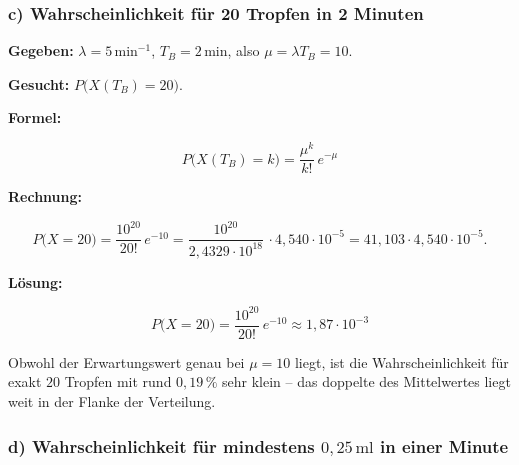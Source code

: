 \subsubsection*{c) Wahrscheinlichkeit für 20 Tropfen in 2 Minuten}

\begin{beispiel}

\textbf{Gegeben:} $\lambda = 5\,\mathrm{min}^{-1}$, $T_B = 2\,\mathrm{min}$,
also $\mu = \lambda T_B = 10$.

\textbf{Gesucht:} $P\bigl(X(T_B) = 20\bigr)$.

\textbf{Formel:}

$$
P\bigl(X(T_B) = k\bigr) = \frac{\mu^k}{k!}\, e^{-\mu}
$$

\textbf{Rechnung:}

$$
P\bigl(X = 20\bigr) = \frac{10^{20}}{20!}\, e^{-10}
= \frac{10^{20}}{2{,}4329 \cdot 10^{18}}\, \cdot 4{,}540 \cdot 10^{-5}
= 41{,}103 \cdot 4{,}540 \cdot 10^{-5}.
$$

\textbf{Lösung:}

$$
\boxed{\;P\bigl(X = 20\bigr) = \frac{10^{20}}{20!}\, e^{-10} \approx 1{,}87 \cdot 10^{-3}\;}
$$

Obwohl der Erwartungswert genau bei $\mu = 10$ liegt, ist die
Wahrscheinlichkeit für exakt $20$ Tropfen mit rund $0{,}19\,\%$ sehr klein --
das doppelte des Mittelwertes liegt weit in der Flanke der Verteilung.

\end{beispiel}

\subsubsection*{d) Wahrscheinlichkeit für mindestens $0{,}25\,\mathrm{ml}$ in einer Minute}

